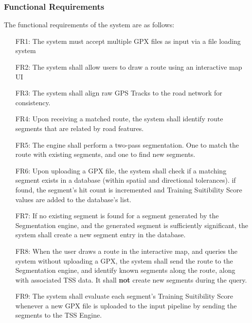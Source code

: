 \documentclass[11pt,a4paper]{report}
\begin{document}
\subsubsection{Functional Requirements}
The functional requirements of the system are as follows:
\begin{enumerate}
	\item[FR1:] The system must accept multiple GPX files as input via a file loading system
	\item[FR2:] The system shall allow users to draw a route using an interactive map UI
	\item[FR3:] The system shall align raw GPS Tracks to the road network for consistency.
	\item[FR4:] Upon receiving a matched route, the system shall identify route segments that are related by road features.
	\item[FR5:] The engine shall perform a two-pass segmentation. One to match the route with existing segments, and one to find new segments.
	\item[FR6:] Upon uploading a GPX file, the system shall check if a matching segment exists in a database (within spatial and directional tolerances).
	      if found, the segment's hit count is incremented and Training Suitibility Score values are added to the database's list.
	\item[FR7:] If no existing segment is found for a segment generated by the Segmentation engine, and the generated segment is sufficiently significant,
	      the system shall create a new segment entry in the database.
	\item[FR8:] When the user draws a route in the interactive map, and queries the system without uploading a GPX, the system shall send the route
	      to the Segmentation engine, and identify known segments along the route, along with associated TSS data. It shall \textbf{not} create new segments during the query.
	\item[FR9:] The system shall evaluate each segment's Training Suitibility Score whenever a new GPX file is uploaded to the input pipeline by sending
	      the segments to the TSS Engine.
\end{enumerate}
\end{document}
